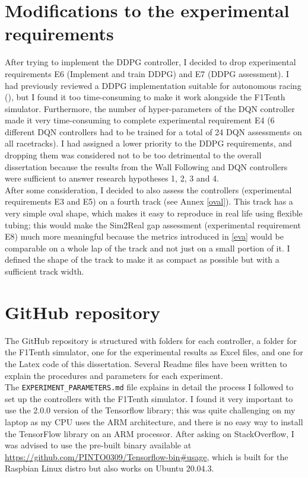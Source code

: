 \section{Modifications to the experimental requirements}
After trying to implement the DDPG controller, I decided to drop experimental requirements E6 (Implement and train DDPG) and E7 (DDPG assessment). I had previously reviewed a DDPG implementation suitable for autonomous racing (\cite{Reference4}), but I found it too time-consuming to make it work alongside the F1Tenth simulator. Furthermore, the number of hyper-parameters of the DQN controller made it very time-consuming to complete experimental requirement E4 (6 different DQN controllers had to be trained for a total of 24 DQN assessments on all racetracks). I had assigned a lower priority to the DDPG requirements, and dropping them was considered not to be too detrimental to the overall dissertation because the results from the Wall Following and DQN controllers were sufficient to answer research hypotheses 1, 2, 3 and 4. \\
After some consideration, I decided to also assess the controllers (experimental requirements E3 and E5) on a fourth track (see Annex \ref{oval}). This track has a very simple oval shape, which makes it easy to reproduce in real life using flexible tubing; this would make the Sim2Real gap assessment (experimental requirement E8) much more meaningful because the metrics introduced in \ref{eva} would be comparable on a whole lap of the track and not just on a small portion of it. I defined the shape of the track to make it as compact as possible but with a sufficient track width. \\
\section{GitHub repository}
The GitHub repository is structured with folders for each controller, a folder for the F1Tenth simulator, one for the experimental results as Excel files, and one for the Latex code of this dissertation. Several Readme files have been written to explain the procedures and parameters for each experiment. \\
The \verb|EXPERIMENT_PARAMETERS.md| file explains in detail the process I followed to set up the controllers with the F1Tenth simulator. I found it very important to use the 2.0.0 version of the Tensorflow library; this was quite challenging on my laptop as my CPU uses the ARM architecture, and there is no easy way to install the TensorFlow library on an ARM processor. After asking on StackOverflow, I was advised to use the pre-built binary available at \url{https://github.com/PINTO0309/Tensorflow-bin#usage}, which is built for the Raspbian Linux distro but also works on Ubuntu 20.04.3. 

